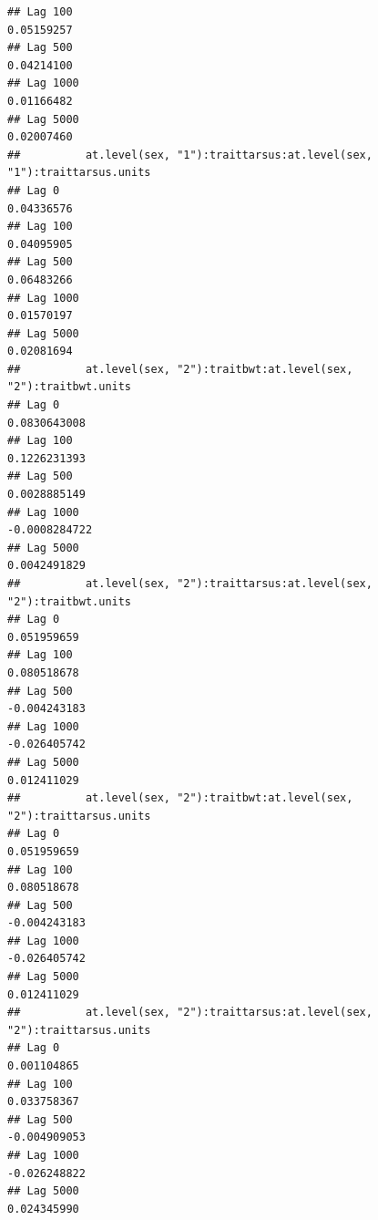 \documentclass[
  12pt,
]{book}
\begin{document}
\begin{verbatim}
## Lag 100                                                        0.05159257
## Lag 500                                                        0.04214100
## Lag 1000                                                       0.01166482
## Lag 5000                                                       0.02007460
##          at.level(sex, "1"):traittarsus:at.level(sex, "1"):traittarsus.units
## Lag 0                                                             0.04336576
## Lag 100                                                           0.04095905
## Lag 500                                                           0.06483266
## Lag 1000                                                          0.01570197
## Lag 5000                                                          0.02081694
##          at.level(sex, "2"):traitbwt:at.level(sex, "2"):traitbwt.units
## Lag 0                                                     0.0830643008
## Lag 100                                                   0.1226231393
## Lag 500                                                   0.0028885149
## Lag 1000                                                 -0.0008284722
## Lag 5000                                                  0.0042491829
##          at.level(sex, "2"):traittarsus:at.level(sex, "2"):traitbwt.units
## Lag 0                                                         0.051959659
## Lag 100                                                       0.080518678
## Lag 500                                                      -0.004243183
## Lag 1000                                                     -0.026405742
## Lag 5000                                                      0.012411029
##          at.level(sex, "2"):traitbwt:at.level(sex, "2"):traittarsus.units
## Lag 0                                                         0.051959659
## Lag 100                                                       0.080518678
## Lag 500                                                      -0.004243183
## Lag 1000                                                     -0.026405742
## Lag 5000                                                      0.012411029
##          at.level(sex, "2"):traittarsus:at.level(sex, "2"):traittarsus.units
## Lag 0                                                            0.001104865
## Lag 100                                                          0.033758367
## Lag 500                                                         -0.004909053
## Lag 1000                                                        -0.026248822
## Lag 5000                                                         0.024345990

\end{verbatim}
\end{document}

